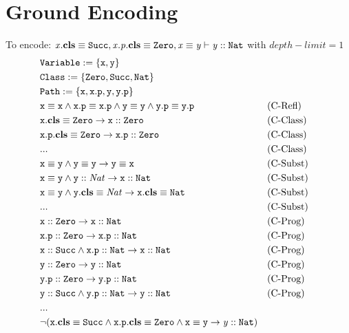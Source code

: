 \documentclass[a4paper]{article}
\begin{document}
\section{Ground Encoding}
To encode: $\mathit{x}.\textbf{cls} \equiv \mathit{\mathtt{Succ}}, \mathit{x.p}.\textbf{cls} \equiv \mathit{\mathtt{Zero}}, \mathit{x} \equiv \mathit{y} \vdash \mathit{y} :: \mathit{\mathtt{Nat}}$
with $\mathit{depth\!\!-\!\!limit}=1$
\setcounter{equation}{0}
\begin{align}
  &\texttt{\ensuremath{\mathtt{Variable}}} := \{\mathtt{x}, \mathtt{y}\}\\
  &\texttt{\ensuremath{\mathtt{Class}}} := \{\mathtt{Zero},\mathtt{Succ},\mathtt{Nat}\}\\
  &\texttt{\ensuremath{\mathtt{Path}}} := \{\mathtt{x}, \mathtt{x.p}, \mathtt{y}, \mathtt{y.p}\}\\
  &\mathit{\mathtt{x}} \equiv \mathit{\mathtt{x}} \land
  \mathit{\mathtt{x.p}} \equiv \mathit{\mathtt{x.p}} \land
  \mathit{\mathtt{y}} \equiv \mathit{\mathtt{y}} \land
  \mathit{\mathtt{y.p}} \equiv \mathit{\mathtt{y.p}} && \text{(C-Refl)}\\
  &\mathit{\mathtt{x}}.\textbf{cls} \equiv \mathit{\mathtt{Zero}} \rightarrow \mathit{\mathtt{x}} :: \mathit{\mathtt{Zero}} && \text{(C-Class)}\\
  &\mathit{\mathtt{x.p}}.\textbf{cls} \equiv \mathit{\mathtt{Zero}} \rightarrow \mathit{\mathtt{x.p}} :: \mathit{\mathtt{Zero}} && \text{(C-Class)}\\
  & ...  && \text{(C-Class)}\\
  & \mathit{\mathtt{x}} \equiv \mathit{\mathtt{y}} \land \mathit{\mathtt{y}} \equiv \mathit{\mathtt{y}} \rightarrow \mathit{\mathtt{y}} \equiv \mathit{\mathtt{x}} && \text{(C-Subst)}\\
  & \mathit{\mathtt{x}} \equiv \mathit{\mathtt{y}} \land \mathit{\mathtt{y}} :: \mathit{Nat} \rightarrow \mathit{\mathtt{x}} :: \mathit{\mathtt{Nat}} && \text{(C-Subst)}\\
  & \mathit{\mathtt{x}} \equiv \mathit{\mathtt{y}} \land \mathit{\mathtt{y}}.\textbf{cls} \equiv \mathit{Nat} \rightarrow \mathit{\mathtt{x}}.\textbf{cls} \equiv \mathit{\mathtt{Nat}} && \text{(C-Subst)}\\
  & ... && \text{(C-Subst)}\\
  &\mathit{\mathtt{x}} :: \mathit{\mathtt{Zero}} \rightarrow \mathit{\mathtt{x}} :: \mathit{\mathtt{Nat}} && \text{(C-Prog)}\\
  &\mathit{\mathtt{x.p}} :: \mathit{\mathtt{Zero}} \rightarrow \mathit{\mathtt{x.p}} :: \mathit{\mathtt{Nat}} && \text{(C-Prog)}\\
  &\mathit{\mathtt{x}} :: \mathit{\mathtt{Succ}} \land \mathit{\mathtt{x.p}} :: \mathit{\mathtt{Nat}} \rightarrow \mathit{\mathtt{x}} :: \mathit{\mathtt{Nat}} && \text{(C-Prog)}\\
  &\mathit{\mathtt{y}} :: \mathit{\mathtt{Zero}} \rightarrow \mathit{\mathtt{y}} :: \mathit{\mathtt{Nat}} && \text{(C-Prog)}\\
  &\mathit{\mathtt{y.p}} :: \mathit{\mathtt{Zero}} \rightarrow \mathit{\mathtt{y.p}} :: \mathit{\mathtt{Nat}} && \text{(C-Prog)}\\
  &\mathit{\mathtt{y}} :: \mathit{\mathtt{Succ}} \land \mathit{\mathtt{y.p}} :: \mathit{\mathtt{Nat}} \rightarrow \mathit{\mathtt{y}} :: \mathit{\mathtt{Nat}} && \text{(C-Prog)}\\
  &...\\
  &\neg (\mathit{\mathtt{x}}.\textbf{cls} \equiv \mathit{\mathtt{Succ}} \land
        \mathit{\mathtt{x.p}}.\textbf{cls} \equiv \mathit{\mathtt{Zero}} \land
        \mathit{\mathtt{x}} \equiv \mathit{\mathtt{y}} \rightarrow
          \mathit{y} :: \mathit{\mathtt{Nat}})
\end{align}
\end{document}
